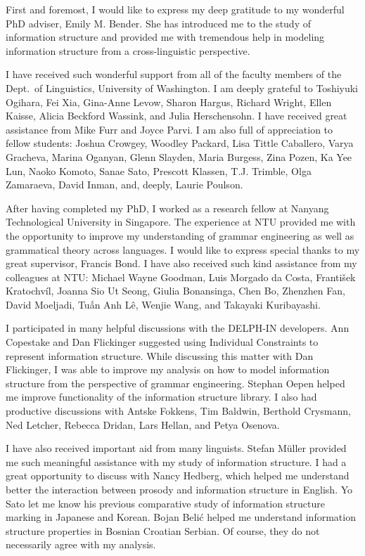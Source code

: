 
First and foremost, I would like to express my deep gratitude to my
wonderful PhD adviser, Emily M. Bender. She has introduced me to the
study of information structure and provided me with tremendous help in
modeling information structure from a cross-linguistic perspective.


I have received such wonderful support from all of the faculty members
of the Dept.\ of Linguistics, University of Washington. I am deeply
grateful to Toshiyuki Ogihara, Fei Xia, Gina-Anne Levow, Sharon
Hargus, Richard Wright, Ellen Kaisse, Alicia Beckford Wassink, and
Julia Herschensohn. I have received great assistance from Mike Furr
and Joyce Parvi. I am also full of appreciation to fellow students:
Joshua Crowgey, Woodley Packard, Lisa Tittle Caballero, Varya
Gracheva, Marina Oganyan, Glenn Slayden, Maria Burgess, Zina Pozen, Ka
Yee Lun, Naoko Komoto, Sanae Sato, Prescott Klassen, T.J. Trimble,
Olga Zamaraeva, David Inman, and, deeply, Laurie Poulson.


After having completed my PhD, I worked as a research fellow at
Nanyang Technological University in Singapore. The experience at NTU
provided me with the opportunity to improve my understanding of
grammar engineering as well as grammatical theory across languages. I
would like to express special thanks to my great supervisor, Francis
Bond. I have also received such kind assistance from my colleagues at
NTU: Michael Wayne Goodman, Luis Morgado da Costa, Franti\v{s}ek
Kratochvíl, Joanna Sio Ut Seong, Giulia Bonansinga, Chen Bo, Zhenzhen
Fan, David Moeljadi, Tu{\'{\^{a}}}n Anh L\^{e}, Wenjie Wang, and
Takayaki Kuribayashi.


I participated in many helpful discussions with the DELPH-IN
developers. Ann Copestake and Dan Flickinger suggested using
Individual Constraints to represent information structure.  While
discussing this matter with Dan Flickinger, I was able to improve my
analysis on how to model information structure from the perspective of
grammar engineering. Stephan Oepen helped me improve functionality of
the information structure library.  I also had productive discussions
with Antske Fokkens, Tim Baldwin, Berthold Crysmann, Ned Letcher,
Rebecca Dridan, Lars Hellan, and Petya Osenova.



I have also received important aid from many linguists. Stefan
M{\"u}ller provided me such meaningful assistance with my study of
information structure. I had a great opportunity to discuss with 
Nancy Hedberg, which helped me understand better the interaction between 
prosody and information structure in English.  
Yo Sato let me know his previous comparative
study of information structure marking in Japanese and Korean. Bojan
Beli{\'c} helped me understand information structure properties in
Bosnian Croatian Serbian. 
Of course, they do not necessarily agree with my analysis.



